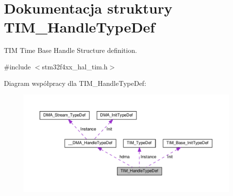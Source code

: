 \hypertarget{struct_t_i_m___handle_type_def}{}\section{Dokumentacja struktury T\+I\+M\+\_\+\+Handle\+Type\+Def}
\label{struct_t_i_m___handle_type_def}


T\+IM Time Base Handle Structure definition.  




{\ttfamily \#include $<$stm32f4xx\+\_\+hal\+\_\+tim.\+h$>$}



Diagram współpracy dla T\+I\+M\+\_\+\+Handle\+Type\+Def\+:\nopagebreak
\begin{figure}[H]
\begin{center}
\leavevmode
\includegraphics[width=350pt]{struct_t_i_m___handle_type_def__coll__graph}
\end{center}
\end{figure}
